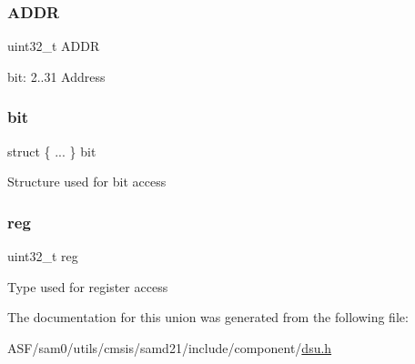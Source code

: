 \subsubsection{\texorpdfstring{ADDR}{ADDR}}
{\footnotesize\ttfamily uint32\+\_\+t A\+D\+DR}

bit\+: 2..31 Address \mbox{\label{union_d_s_u___a_d_d_r___type_a292415e9c83fe025ff0f260ab8ee8e2c}} 
\subsubsection{\texorpdfstring{bit}{bit}}
{\footnotesize\ttfamily struct \{ ... \}   bit}

Structure used for bit access \mbox{\label{union_d_s_u___a_d_d_r___type_a6b91636401516a477989a336376d7b40}} 
\subsubsection{\texorpdfstring{reg}{reg}}
{\footnotesize\ttfamily uint32\+\_\+t reg}

Type used for register access 

The documentation for this union was generated from the following file\+:\begin{DoxyCompactItemize}
\item 
A\+S\+F/sam0/utils/cmsis/samd21/include/component/\mbox{\hyperlink{component_2dsu_8h}{dsu.\+h}}\end{DoxyCompactItemize}
